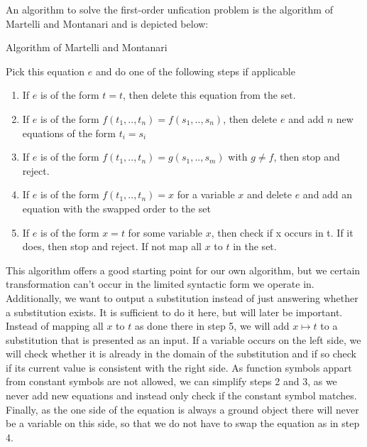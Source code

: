 \documentclass{article}
\begin{document}
        An algorithm to solve the first-order unfication problem is the algorithm of Martelli and Montanari \cite{MartMont} and is depicted below:
        \begin{algorithm}
            \caption{Algorithm of Martelli and Montanari}
        \begin{algorithmic}
            \State Pick this equation $e$ and do one of the following steps if applicable
            \begin{enumerate}
                \item If $e$ is of the form $t = t$, then delete this equation from the set.
                \item If $e$ is of the form $f(t_1, .., t_n) = f(s_1,.., s_n)$, then delete $e$ and add $n$ new equations of the form $t_i = s_i$
                \item If $e$ is of the form $f(t_1, .., t_n) = g(s_1,.., s_m)$ with $g \neq f$, then stop and reject.
                \item If $e$ is of the form $f(t_1,..,t_n) = x$ for a variable $x$ and delete $e$ and add an equation with the swapped order to the set
                \item If $e$ is of the form $x=t$ for some variable $x$, then check if x occurs in t. If it does, then stop and reject. If not map all $x$ to $t$ in the set.
            \end{enumerate}
            \EndWhile
        \end{algorithmic}
        \end{algorithm}

        This algorithm offers a good starting point for our own algorithm, but we certain transformation can't occur in the limited syntactic form we operate in. Additionally, we want to output a substitution instead of just answering whether a substitution exists. It is sufficient to do it here, but will later be important. Instead of mapping all $x$ to $t$ as done there in step 5, we will add $x\mapsto t$ to a substitution that is presented as an input. If a variable occurs on the left side, we will check whether it is already in the domain of the substitution and if so check if its current value is consistent with the right side.
        As function symbols appart from constant symbols are not allowed, we can simplify steps 2 and 3, as we never add new equations and instead only check if the constant symbol matches. Finally, as the one side of the equation is always a ground object there will never be a variable on this side, so that we do not have to swap the equation as in step 4.
\end{document}
